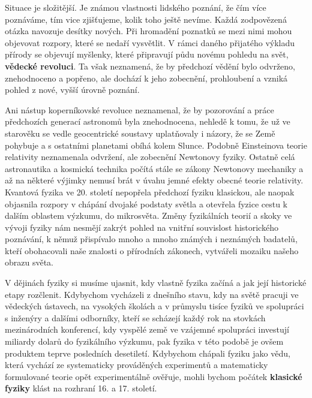       Situace je složitější. Je známou vlastnosti lidského poznání, že čím více poznáváme, tím vice
      zjišťujeme, kolik toho ještě nevíme. Každá zodpovězená otázka navozuje desítky nových. Při
      hromadění poznatků se mezi nimi mohou objevovat rozpory, které se nedaří vysvětlit. V rámci
      daného přijatého výkladu přírody se objevují myšlenky, které připravují půdu novému pohledu na
      svět, \textbf{vědecké revoluci}. Ta však neznamená, že by předchozí vědění bylo odvrženo,
      znehodnoceno a popřeno, ale dochází k jeho zobecnění, prohloubení a vzniká pohled z nové,
      vyšší úrovně poznání.

      Ani nástup koperníkovské revoluce neznamenal, že by pozorování a práce předchozích generací
      astronomů byla znehodnocena, nehledě k tomu, že už ve starověku se vedle geocentrické soustavy
      uplatňovaly i názory, že se Země pohybuje a s ostatními planetami obíhá kolem Slunce. Podobně
      Einsteinova teorie relativity neznamenala odvržení, ale zobecnění Newtonovy fyziky. Ostatně
      celá astronautika a kosmická technika počítá stále se zákony Newtonovy mechaniky a až na
      některé výjimky nemusí brát v úvahu jemné efekty obecné teorie relativity. Kvantová fyzika ve
      20. století nepopřela předchozí fyziku klasickou, ale naopak objasnila rozpory v chápání
      dvojaké podstaty světla a otevřela fyzice cestu k dalším oblastem výzkumu, do mikrosvěta.
      Změny fyzikálních teorií a skoky ve vývoji fyziky nám nesmějí zakrýt pohled na vnitřní
      souvislost historického poznávání, k němuž přispívalo mnoho a mnoho známých i neznámých
      badatelů, kteří obohacovali naše znalosti o přírodních zákonech, vytvářeli mozaiku našeho
      obrazu světa.

      V dějinách fyziky si musíme ujasnit, kdy vlastně fyzika začíná a jak její historické etapy
      rozčlenit. Kdybychom vycházeli z dnešního stavu, kdy na světě pracuji ve vědeckých ústavech,
      na vysokých školách a v průmyslu tisíce fyziků ve spolupráci s inženýry a dalšími odborníky,
      kteří se scházejí každý rok na stovkách mezinárodních konferencí, kdy vyspělé země ve vzájemné
      spolupráci investují miliardy dolarů do fyzikálního výzkumu, pak fyzika v této podobě je ovšem
      produktem teprve posledních desetiletí. Kdybychom chápali fyziku jako vědu, která vychází ze
      systematicky prováděných experimentů a matematicky formulované teorie opět experimentálně
      ověřuje, mohli bychom počátek \textbf{klasické fyziky} klást na rozhraní 16. a 17. století.

